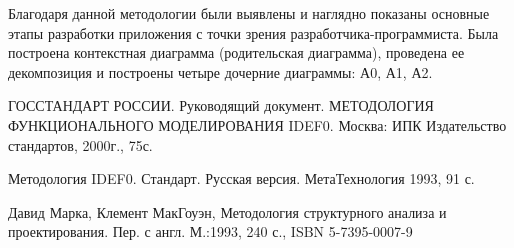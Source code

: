 \documentclass[a4paper, final]{article}
\begin{document}
Благодаря данной методологии были выявлены и наглядно показаны основные этапы разработки приложения с точки зрения 
разработчика-программиста. Была построена контекстная диаграмма (родительская диаграмма), проведена ее декомпозиция и 
построены четыре дочерние диаграммы: А0, А1, А2. 

\cleardoublepage
{}
\newpage
\begin{thebibliography}{0}
	ГОССТАНДАРТ РОССИИ. Руководящий документ. МЕТОДОЛОГИЯ ФУНКЦИОНАЛЬНОГО МОДЕЛИРОВАНИЯ IDEF0. 
	Москва: ИПК Издательство стандартов, 2000г., 75с.

	Методология IDEF0. Стандарт. Русская версия. МетаТехнология 1993, 91 с.

  Давид Марка, Клемент МакГоуэн, Методология структурного анализа и проектирования. Пер. с англ. М.:1993, 240 с., ISBN 5-7395-0007-9
\end{thebibliography}
\end{document}
